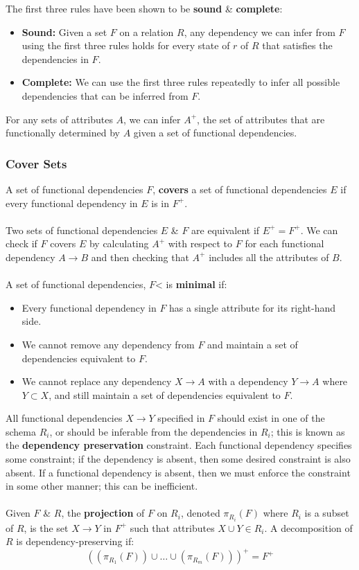 \documentclass[a4paper,11pt]{article}
\begin{document}
The first three rules have been shown to be \textbf{sound} \& \textbf{complete}:
\begin{itemize}
    \item   \textbf{Sound:} Given a set $F$ on a relation $R$, any dependency we can infer from $F$ using the first three 
            rules holds for every state of $r$ of $R$ that satisfies the dependencies in $F$.
    \item   \textbf{Complete:} We can use the first three rules repeatedly to infer all possible dependencies that can be 
            inferred from $F$.
\end{itemize}

For any sets of attributes $A$, we can infer $A^+$, the set of attributes that are functionally determined by $A$ given 
a set of functional dependencies.

\subsubsection{Cover Sets}
A set of functional dependencies $F$, \textbf{covers} a set of functional dependencies $E$ if every functional dependency
in $E$ is in $F^+$.
\\\\ 
Two sets of functional dependencies $E$ \& $F$ are equivalent if $E^+ = F^+$.
We can check if $F$ covers $E$ by calculating $A^+$ with respect to $F$ for each functional dependency $A \rightarrow B$ 
and then checking that $A^+$ includes all the attributes of $B$.
\\\\ 
A set of functional dependencies, $F$< is \textbf{minimal} if: 
\begin{itemize}
    \item   Every functional dependency in $F$ has a single attribute for its right-hand side. 
    \item   We cannot remove any dependency from $F$ and maintain a set of dependencies equivalent to $F$. 
    \item   We cannot replace any dependency $X \rightarrow A$ with a dependency $Y \rightarrow A$ where $Y \subset X$, 
            and still maintain a set of dependencies equivalent to $F$.
\end{itemize}

All functional dependencies $X \rightarrow Y$ specified in $F$ should exist in one of the schema $R_i$, or should be 
inferable from the dependencies in $R_i$; this is known as the \textbf{dependency preservation} constraint.
Each functional dependency specifies some constraint; if the dependency is absent, then some desired constraint is also 
absent.
If a functional dependency is absent, then we must enforce the constraint in some other manner; this can be inefficient.
\\\\ 
Given $F$ \& $R$, the \textbf{projection} of $F$ on $R_i$, denoted $\pi_{R_i}(F)$ where $R_i$ is a subset of $R$, is the 
set $X \rightarrow Y$ in $F^+$ such that attributes $X \cup Y \in R_i$.
A decomposition of $R$ is dependency-preserving if:
$$
((\pi_{R_1}(F)) \cup \dots \cup (\pi_{R_m}(F)))^+ = F^+
$$
\end{document}
